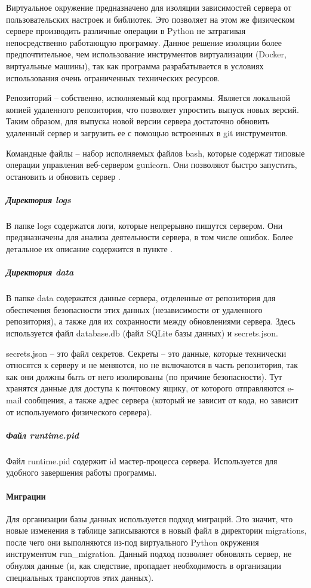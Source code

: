 \documentclass[explnote]{espd}
\begin{document}
Виртуальное окружение предназначено для изоляции зависимостей сервера от пользовательских настроек и библиотек. Это позволяет на этом же физическом сервере производить различные операции в Python не затрагивая непосредственно работающую программу. Данное решение изоляции более предпочтительное, чем использование инструментов виртуализации (Docker, виртуальные машины), так как программа разрабатывается в условиях использования очень ограниченных технических ресурсов.

Репозиторий -- собственно, исполняемый код программы. Является локальной копией удаленного репозитория, что позволяет упростить выпуск новых версий. Таким образом, для выпуска новой версии сервера достаточно обновить удаленный сервер и загрузить ее с помощью встроенных в git инструментов.

Командные файлы -- набор исполняемых файлов bash, которые содержат типовые операции управления веб-сервером gunicorn. Они позволяют быстро запустить, остановить и обновить сервер .

\subparagraph{Директория logs}
В папке logs содержатся логи, которые непрерывно пишутся сервером. Они предзназначены для анализа деятельности сервера, в том числе ошибок. Более детальное их описание содержится в пункте \label{paragraph:output}.

\subparagraph{Директория data}
В папке data содержатся данные сервера, отделенные от репозитория для обеспечения безопасности этих данных (независимости от удаленного репозитория), а также для их сохранности между обновлениями сервера. Здесь используется файл database.db (файл SQLite базы данных) и secrets.json.

secrets.json -- это файл секретов. Секреты -- это данные, которые технически относятся к серверу и не меняются, но не включаются в часть репозитория, так как они должны быть от него изолированы (по причине безопасности). Тут хранятся данные для доступа к почтовому ящику, от которого отправляются e-mail сообщения, а также адрес сервера (который не зависит от кода, но зависит от используемого физического сервера).

\subparagraph{Файл runtime.pid}
Файл runtime.pid содержит id мастер-процесса сервера. Используется для удобного завершения работы программы.

\paragraph{Миграции}
Для организации базы данных используется подход миграций. Это значит, что новые изменения в таблице записываются в новый файл в директории migrations, после чего они выполняются из-под виртуального Python окружения инструментом run\_migration. Данный подход позволяет обновлять сервер, не обнуляя данные (и, как следствие, пропадает необходимость в организации специальных транспортов этих данных).
\end{document}
